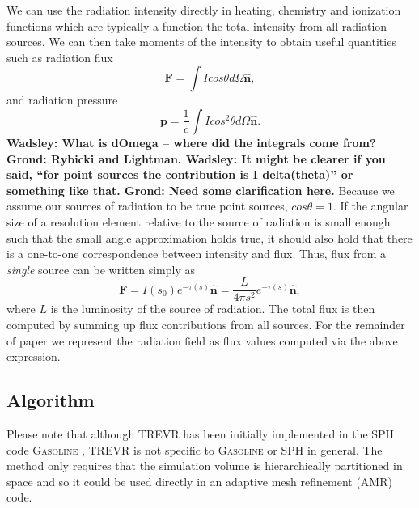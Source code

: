 \documentclass[fleq,usenatbib]{mnras}
\newcommand{\acro}{TREVR}
\newcommand{\comment}[1]{\textbf{\color{red}#1}}
\begin{document}
We can use the radiation intensity directly in heating, chemistry and 
ionization functions which are typically a function the total intensity from 
all radiation sources. We can then take moments of the intensity to obtain 
useful quantities such as radiation flux 
\begin{equation}
\label{eqn:flux}
\mathbf{F} = \int I cos\theta d\Omega \mathbf{\hat{n}},
\end{equation}
and radiation pressure
\begin{equation}
\label{eqn:pressure}
\mathbf{p} = \frac{1}{c}\int I cos^2\theta d\Omega \mathbf{\hat{n}}.
\end{equation}
\comment{Wadsley: What is dOmega -- where did the integrals come from? Grond: 
Rybicki and Lightman. Wadsley: It might be clearer if you said, ``for point 
sources the contribution is I delta(theta)'' or something like that. Grond: 
Need some clarification here.}
Because we assume our sources of radiation to be true point sources, 
$cos\theta = 1$. If the angular size of a resolution element relative to the 
source of radiation is small enough such that the small angle approximation 
holds true, it should also hold that there is a one-to-one correspondence 
between intensity and flux. Thus, flux from a \textit{single} source can be 
written simply as 
\begin{equation}
\label{eqn:simpflux}
\mathbf{F} = I(s_0)e^{-\tau(s)} \mathbf{\hat{n}} = \frac{L}{4\pi s^2}
e^{-\tau(s)} \mathbf{\hat{n}},
\end{equation}
where $L$ is the luminosity of the source of radiation. The total flux is then 
computed by summing up flux contributions from all sources. For the remainder 
of paper we represent the radiation field as flux values computed via the 
above expression. 

\subsection{Algorithm}\label{sec:algo}
Please note that although \acro{} has been initially implemented in the 
SPH code \textsc{Gasoline} \citep{wadsleyEt03}, \acro{} is not specific to 
\textsc{Gasoline} or SPH in general. The method only requires that the 
simulation volume is hierarchically partitioned in space and so it could be 
used directly in an adaptive mesh refinement (AMR) code.
 
\end{document}
